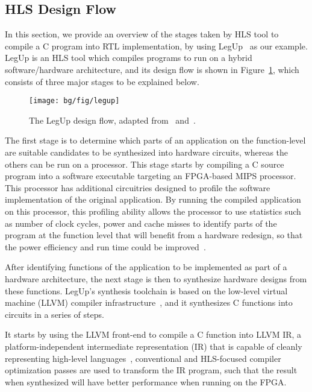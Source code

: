 \subsection{HLS Design Flow}
\label{bg:sub:hls_design}

In this section, we provide an overview of the stages taken by HLS tool to
compile a C program into RTL implementation, by using LegUp~\cite{legup,
canis13} as our example.  LegUp is an HLS tool which compiles programs to run
on a hybrid software/hardware architecture, and its design flow is shown in
Figure~\ref{bg:fig:legup}, which consists of three major stages to be explained
below.
\begin{figure}[ht]
    \centering
    \texttt{[image: bg/fig/legup]}
    \caption{%
        The LegUp design flow, adapted from~\cite{canis13} and~\cite{legup}.
    }\label{bg:fig:legup}
\end{figure}

The first stage is to determine which parts of an application on the
function-level are suitable candidates to be synthesized into hardware
circuits, whereas the others can be run on a processor.  This stage starts by
compiling a C source program into a software executable targeting an FPGA-based
MIPS processor.  This processor has additional circuitries designed to profile
the software implementation of the original application.  By running the
compiled application on this processor, this profiling ability allows the
processor to use statistics such as number of clock cycles, power and cache
misses to identify parts of the program at the function level that will benefit
from a hardware redesign, so that the power efficiency and run time could be
improved~\cite{canis13}.

After identifying functions of the application to be implemented as part
of a hardware architecture, the next stage is then to synthesize hardware
designs from these functions.  LegUp's synthesis toolchain is based on the
low-level virtual machine (LLVM) compiler infrastructure~\cite{llvm}, and it
synthesizes C functions into circuits in a series of steps.

It starts by using the LLVM front-end to compile a C function into LLVM IR,
a platform-independent intermediate representation (IR) that is capable of
cleanly representing high-level languages~\cite{llvm_ir}, conventional and
HLS-focused compiler optimization passes are used to transform the IR program,
such that the result when synthesized will have better performance when
running on the FPGA\@.

